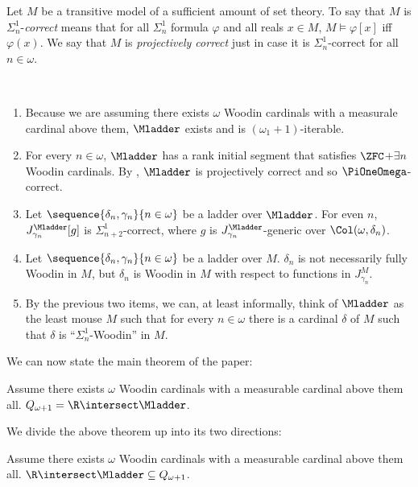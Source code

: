 \documentclass[oneside,12pt]{amsart}
\begin{document}
Let $M$ be a transitive model of a sufficient amount of set theory. To say that $M$ is 
$\Sigma^1_n$-\emph{correct} means that for all $\Sigma^1_n$ formula $\varphi$ and all
reals $x\in M$, $M\models\varphi[x]$ iff $\varphi(x)$. We say that $M$ is \emph{projectively correct}
just in case it is $\Sigma^1_n$-correct for all $n\in\omega$.

\begin{remarks} \
\begin{enumerate}
\item Because we are assuming there exists $\omega$ Woodin cardinals with a measurale cardinal above them, $\Mladder$ exists and is $(\omega_1+1)$-iterable.
\item For every $n\in\omega$, $\Mladder$ has a rank initial segment that satisfies
$\ZFC$+$\exists n$ Woodin cardinals.  By \cite{Proj_WO_In_Mod}, $\Mladder$ is projectively correct and so $\PiOneOmega$-correct.
\item Let $\sequence{\delta_n,\gamma_n}{n\in\omega}$ be a ladder over $\Mladder$.
For even $n$, $J^{\Mladder}_{\gamma_n}[g]$ is $\Sigma^1_{n+2}$-correct,
where $g$ is $J^{\Mladder}_{\gamma_n}$-generic over $\Col(\omega,\delta_n)$.
\item Let $\sequence{\delta_n,\gamma_n}{n\in\omega}$ be a ladder over $M$.
$\delta_n$ is not necessarily fully Woodin in $M$, but $\delta_n$ is Woodin in $M$
with respect to functions in $J^M_{\gamma_n}$.
\item By the previous two items, we can, at least informally, think of
$\Mladder$ as the least mouse
$M$ such that for every $n\in\omega$ there is a cardinal $\delta$ of $M$ such
that $\delta$ is ``$\Sigma^1_n$-Woodin'' in $M$.
\end{enumerate}
\end{remarks}

We can now state the main theorem of the paper:

\begin{theorem}
Assume there exists $\omega$ Woodin cardinals with a measurable cardinal above them all.
$Q_{\omega+1} = \R \intersect \Mladder$.
\end{theorem}

We divide the above theorem up into its two directions:

\begin{theorem}
\label{MRealsAreDefinable}
Assume there exists $\omega$ Woodin cardinals with a measurable cardinal above them all.
$\R \intersect \Mladder \subseteq Q_{\omega+1}$.
\end{theorem}
\end{document}
